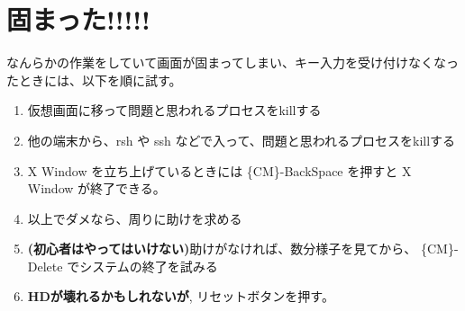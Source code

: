 \documentclass{jreport}
\begin{document}
\section{固まった!!!!!}

なんらかの作業をしていて画面が固まってしまい、キー入力を受け付けなくなっ
たときには、以下を順に試す。

\begin{enumerate}
\item 仮想画面に移って問題と思われるプロセスをkillする
\item 他の端末から、rsh や ssh などで入って、問題と思われるプロセスをkillする
\item X Window を立ち上げているときには \{CM\}-BackSpace を押すと X
Window が終了できる。
\item 以上でダメなら、周りに助けを求める
\item \textbf{(初心者はやってはいけない)}助けがなければ、数分様子を見てから、
  \{CM\}-Delete でシステムの終了を試みる
\item \textbf{HDが壊れるかもしれないが}, リセットボタンを押す。
\end{enumerate}

\printindex
\end{document}
